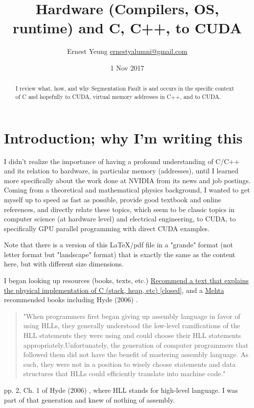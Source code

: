 \documentclass[10pt]{amsart}
\title[Hardware (Compilers, OS, runtime) and C, C++, to CUDA]{Hardware (Compilers, OS, runtime) and C, C++, to CUDA}
\author{Ernest Yeung \href{mailto:ernestyalumni@gmail.com}{ernestyalumni@gmail.com}}
\date{1 Nov 2017}
\begin{document}

\maketitle

\tableofcontents

\begin{abstract}
I review what, how, and why Segmentation Fault is and occurs in the specific context of C and hopefully to CUDA, virtual memory addresses in C++, and to CUDA.  


\end{abstract}

\section{Introduction; why I'm writing this}  

I didn't realize the importance of having a profound understanding of C/C++ and its relation to hardware, in particular memory (addresses), until I learned more specifically about the work done at NVIDIA from its news and job postings.  Coming from a theoretical and mathematical physics background, I wanted to get myself up to speed as fast as possible, provide good textbook and online references, and directly relate these topics, which seem to be classic topics in computer science (at hardware level) and electrical engineering, to CUDA, to specifically GPU parallel programming with direct CUDA examples.  

Note that there is a version of this LaTeX/pdf file in a "grande" format (not letter format but "landscape" format) that is exactly the same as the content here, but with different size dimensions.  


I began looking up resources (books, texts, etc.) \href{https://softwareengineering.stackexchange.com/questions/127101/recommend-a-text-that-explains-the-physical-implementation-of-c-stack-heap-et}{Recommend a text that explains the physical implementation of C (stack, heap, etc) [closed]}, and a \href{https://softwareengineering.stackexchange.com/users/39294/dipan-mehta}{Mehta} recommended books including Hyde (2006) \cite{Hyde2006}.  

\begin{quotation}
	"When programmers first began giving up assembly language in favor of using HLLs, they generally understood the low-level ramifications of the HLL statements they were using and could choose their HLL statements appropriately.Unfortunately, the generation of computer programmers that followed them did not have the benefit of mastering assembly language. As such, they were not in a position to wisely choose statements and data structures that HLLs could efficiently translate into machine code."  
\end{quotation}
pp. 2, Ch. 1 of Hyde (2006) \cite{Hyde2006}, where HLL stands for high-level language.  I was part of that generation and knew of nothing of assembly.  
\end{document}
